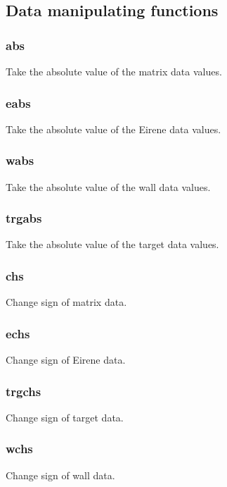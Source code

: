 \documentclass[a4paper,10pt]{report}
\begin{document}
\subsection{Data manipulating functions}\label{sec:datamanipulation}

\subsubsection{abs}\label{sec:abs}
Take the absolute value of the matrix data values.

\subsubsection{eabs}\label{sec:eabs}
Take the absolute value of the Eirene data values.

\subsubsection{wabs}\label{sec:wabs}
Take the absolute value of the wall data values.

\subsubsection{trgabs}\label{sec:trgabs}
Take the absolute value of the target data values.

\subsubsection{chs}\label{sec:chs}
Change sign of matrix data.

\subsubsection{echs}\label{sec:echs}
Change sign of Eirene data.

\subsubsection{trgchs}\label{sec:trgchs}
Change sign of target data.

\subsubsection{wchs}\label{sec:wchs}
Change sign of wall data.
\end{document}
